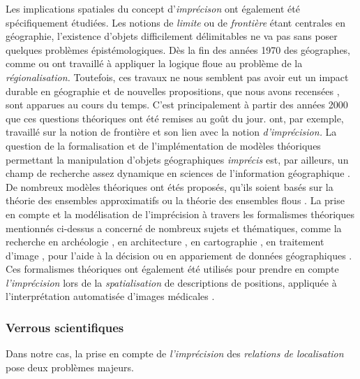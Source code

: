 Les implications spatiales du concept d'\emph{imprécison} ont
également été spécifiquement étudiées. Les notions de \emph{limite} ou
de \emph{frontière} étant centrales en géographie, l’existence
d'objets difficilement délimitables ne va pas sans poser quelques
problèmes épistémologiques. Dès la fin des années 1970 des géographes,
comme \textcite{Gale1976} ou \textcite{Leung1979} ont travaillé à
appliquer la logique floue au problème de la \emph{régionalisation.}
Toutefois, ces travaux ne nous semblent pas avoir eut un impact
durable en géographie et de nouvelles propositions, que nous avons
recensées \autocite{Bunel2020}, sont apparues au cours du temps. C'est
principalement à partir des années 2000 que ces questions théoriques
ont été remises au goût du
jour. \textcite{Varzi2001,Varzi2015,Smith2000,Collins2000} ont, par
exemple, travaillé sur la notion de frontière et son lien avec la
notion \emph{d'imprécision.} La question de la formalisation et de
l'implémentation de modèles théoriques permettant la manipulation
d'objets géographiques \emph{imprécis} est, par ailleurs, un champ de
recherche assez dynamique en sciences de l'information géographique
\autocite{Bunel2020}. De nombreux modèles théoriques ont étés
proposés, qu'ils soient basés sur la théorie des ensembles
approximatifs \autocite{Schneider1996,Cohn1996,Clementini1996} ou la
théorie des ensembles flous \autocite{Schneider1999}. La prise en
compte et la modélisation de l'imprécision à travers les formalismes
théoriques mentionnés ci-dessus a concerné de nombreux sujets et
thématiques, comme la recherche en archéologie \autocite{Runz2008a,
  Zoghlami2016}, en architecture \autocite{Arabacioglu2010}, en
cartographie \autocite{Didelon2009,Didelon2011}, en traitement d'image
\autocite{Brandtberg2002}, pour l'aide à la décision
\autocite{Griot2007,Makropoulos2003} ou en appariement de données
géographiques \autocite{Olteanu2008}. Ces formalismes théoriques ont
également été utilisés pour prendre en compte \emph{l'imprécision}
lors de la \emph{spatialisation} de descriptions de positions,
appliquée à l'interprétation automatisée d'images médicales
\autocite{Takemura2012,Vanegas2011,Bloch1996,Hudelot2008}.

\subsubsection{Verrous scientifiques}

Dans notre cas, la prise en compte de \emph{l'imprécision} des
\emph{relations de localisation} pose deux problèmes majeurs.


